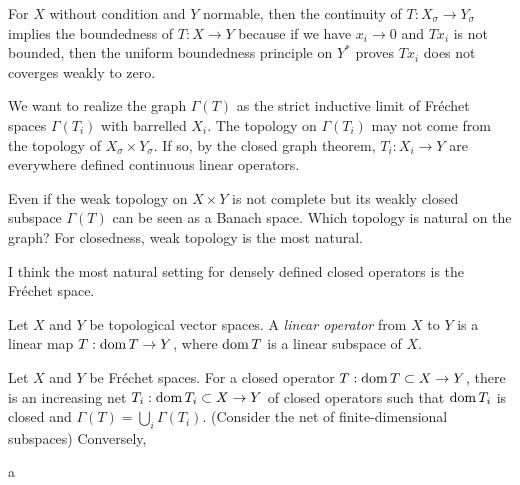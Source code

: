 \documentclass{../../large}
\begin{document}
For $X$ without condition and $Y$ normable, then the continuity of $T:X_\sigma\to Y_\sigma$ implies the boundedness of $T:X\to Y$ because if we have $x_i\to0$ and $Tx_i$ is not bounded, then the uniform boundedness principle on $Y^*$ proves $Tx_i$ does not coverges weakly to zero.


We want to realize the graph $\Gamma(T)$ as the strict inductive limit of Fr\'echet spaces $\Gamma(T_i)$ with barrelled $X_i$.
The topology on $\Gamma(T_i)$ may not come from the topology of $X_\sigma\times Y_\sigma$.
If so, by the closed graph theorem, $T_i:X_i\to Y$ are everywhere defined continuous linear operators.


Even if the weak topology on $X\times Y$ is not complete but its weakly closed subspace $\Gamma(T)$ can be seen as a Banach space.
Which topology is natural on the graph?
For closedness, weak topology is the most natural.


I think the most natural setting for densely defined closed operators is the Fr\'echet space.

\begin{prb}
Let $X$ and $Y$ be topological vector spaces.
A \emph{linear operator} from $X$ to $Y$ is a linear map $T:\operatorname{dom} T\to Y$, where $\operatorname{dom} T$ is a linear subspace of $X$.

\end{prb}

\begin{prb}
Let $X$ and $Y$ be Fr\'echet spaces.
For a closed operator $T:\operatorname{dom} T\subset X\to Y$, there is an increasing net $T_i:\operatorname{dom} T_i\subset X\to Y$ of closed operators such that $\operatorname{dom} T_i$ is closed and $\Gamma(T)=\bigcup_i\Gamma(T_i)$. (Consider the net of finite-dimensional subspaces)
Conversely, 

\begin{parts}
\item a
\end{parts}
\end{prb}
\end{document}

